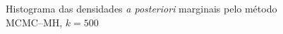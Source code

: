 \documentclass[9pt]{beamer}
\begin{document}
\begin{frame}
\begin{figure}[t]
	\caption{Histograma das densidades \textit{a posteriori} marginais pelo método MCMC--MH, $k = 500$}%
\end{figure}
\end{frame}
\begin{frame}
\begin{figure}[t]%
	\centering
	\qquad
	\subfloat[Histograma de $\nu$]{{
			\label{fig:nu_mh_5000}
}}
\end{figure}
\end{frame}
\end{document}
